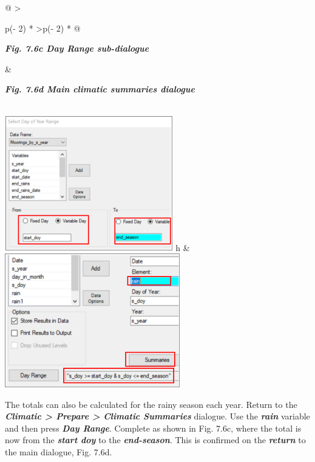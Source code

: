 \documentclass[
  letterpaper,
  DIV=11,
  numbers=noendperiod]{scrreprt}
\begin{document}
\begin{longtable}[]{@{}
  >{\raggedright\arraybackslash}p{(\columnwidth - 2\tabcolsep) * }
  >{\raggedleft\arraybackslash}p{(\columnwidth - 2\tabcolsep) * }@{}}
\toprule\noalign{}
\begin{minipage}[b]{\linewidth}\raggedright
\textbf{\emph{Fig. 7.6c Day Range sub-dialogue}}
\end{minipage} & \begin{minipage}[b]{\linewidth}\raggedleft
\textbf{\emph{Fig. 7.6d Main climatic summaries dialogue}}
\end{minipage} \\
\midrule\noalign{}
\endhead
\bottomrule\noalign{}
\endlastfoot
\includegraphics[width=2.88212in,height=2.30841in]{figures/Fig7.6c.png}
h &
\includegraphics[width=2.9965in,height=\textheight]{figures/Fig7.6d.png} \\
\end{longtable}

The totals can also be calculated for the rainy season each year. Return
to the \textbf{\emph{Climatic \textgreater{} Prepare \textgreater{}
Climatic Summaries}} dialogue. Use the \textbf{\emph{rain}} variable and
then press \textbf{\emph{Day Range}}. Complete as shown in Fig. 7.6c,
where the total is now from the \textbf{\emph{start doy}} to the
\textbf{\emph{end-season}}. This is confirmed on the
\textbf{\emph{return}} to the main dialogue, Fig. 7.6d.
\end{document}
